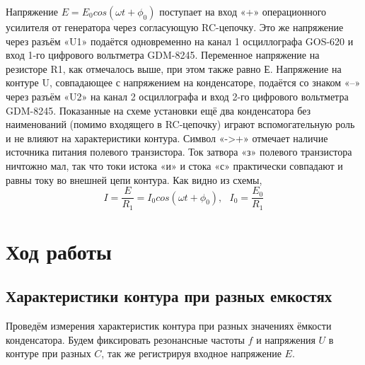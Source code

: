 \documentclass[a4paper]{article}
\begin{document}
Напряжение $ E = E_0cos(\omega t + \phi_0) $ поступает на вход «+» операционного усилителя от генератора через согласующую RC-цепочку. Это же напряжение через разъём «U1» подаётся одновременно на канал 1 осциллографа GOS-620 и вход 1-го цифрового вольтметра GDM-8245. Переменное напряжение на резисторе R1, как отмечалось выше, при этом также равно Е. Напряжение на контуре U, совпадающее с напряжением на конденсаторе, подаётся со знаком «–» через разъём «U2» на канал 2 осциллографа и вход 2-го цифрового вольтметра GDM-8245. Показанные на схеме установки ещё два конденсатора без наименований (помимо входящего в RC-цепочку) играют вспомогательную роль и не влияют на характеристики контура. Символ «->+» отмечает наличие источника питания полевого транзистора. Ток затвора «з» полевого транзистора ничтожно мал, так что токи истока «и» и стока «с» практически совпадают и равны току во внешней цепи контура. Как видно из схемы, \[ I = \frac{E}{R_1} = I_0cos(\omega t + \phi_0), \:\:\: I_0 = \frac{E_0}{R_1} \]

\section{Ход работы}

\subsection{Характеристики контура при разных емкостях}



Проведём измерения характеристик контура при разных значениях ёмкости конденсатора. Будем фиксировать резонансные частоты $f$ и напряжения $U$ в контуре при разных $C$, так же регистрируя входное напряжение $E$.
\end{document}
